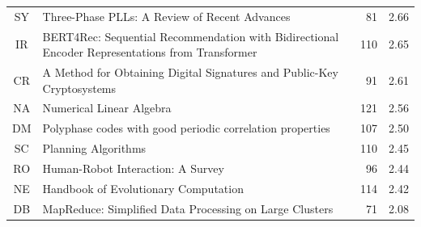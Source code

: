 \begin{table}[t]
\begin{tabular}{clrc}
SY & Three-Phase PLLs: A Review of Recent Advances & \cellcolor{green!8}81 & \cellcolor{green!8}2.66 \\
IR & BERT4Rec: Sequential Recommendation with Bidirectional Encoder Representations from Transformer & \cellcolor{green!8}110 & \cellcolor{green!8}2.65 \\
CR & A Method for Obtaining Digital Signatures and Public-Key Cryptosystems & \cellcolor{green!8}91 & \cellcolor{green!8}2.61 \\
NA & Numerical Linear Algebra & \cellcolor{green!8}121 & \cellcolor{green!8}2.56 \\
DM & Polyphase codes with good periodic correlation properties & \cellcolor{green!8}107 & \cellcolor{green!8}2.50 \\
SC & Planning Algorithms & \cellcolor{green!8}110 & \cellcolor{green!8}2.45 \\
RO & Human-Robot Interaction: A Survey & \cellcolor{green!8}96 & \cellcolor{green!8}2.44 \\
NE & Handbook of Evolutionary Computation & \cellcolor{green!8}114 & \cellcolor{green!8}2.42 \\
DB & MapReduce: Simplified Data Processing on Large Clusters & \cellcolor{green!8}71 & \cellcolor{green!8}2.08 \\
\bottomrule
\end{tabular}
\end{table}